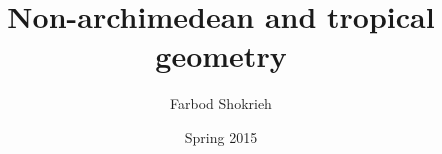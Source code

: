 \documentclass[oneside]{book}
\title{Non-archimedean and tropical geometry}
\author{Farbod Shokrieh}
\date{Spring 2015}
\begin{document}

\begin{titlepage}
\maketitle
\thispagestyle{empty}
\end{titlepage}


\frontmatter
\tableofcontents


\mainmatter









\end{document}
